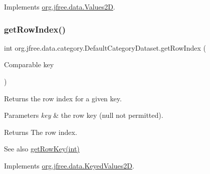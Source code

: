 Implements \mbox{\hyperlink{interfaceorg_1_1jfree_1_1data_1_1_values2_d_a9ce939b45128515a9841a7d018a6ad0e}{org.\+jfree.\+data.\+Values2D}}.

\mbox{\label{classorg_1_1jfree_1_1data_1_1category_1_1_default_category_dataset_a2ba50eec333627d8a187c2f252b8600a}} 
\subsubsection{\texorpdfstring{get\+Row\+Index()}{getRowIndex()}}
{\footnotesize\ttfamily int org.\+jfree.\+data.\+category.\+Default\+Category\+Dataset.\+get\+Row\+Index (\begin{DoxyParamCaption}\item[{Comparable}]{key }\end{DoxyParamCaption})}

Returns the row index for a given key.


\begin{DoxyParams}{Parameters}
{\em key} & the row key ({\ttfamily null} not permitted).\\
\hline
\end{DoxyParams}
\begin{DoxyReturn}{Returns}
The row index.
\end{DoxyReturn}
\begin{DoxySeeAlso}{See also}
\mbox{\hyperlink{classorg_1_1jfree_1_1data_1_1category_1_1_default_category_dataset_a8828cdefd54d499565516fa42d44f89a}{get\+Row\+Key(int)}} 
\end{DoxySeeAlso}


Implements \mbox{\hyperlink{interfaceorg_1_1jfree_1_1data_1_1_keyed_values2_d_ae92ded12999f2872687a5754ddf29254}{org.\+jfree.\+data.\+Keyed\+Values2D}}.

\mbox{\label{classorg_1_1jfree_1_1data_1_1category_1_1_default_category_dataset_a8828cdefd54d499565516fa42d44f89a}} 
